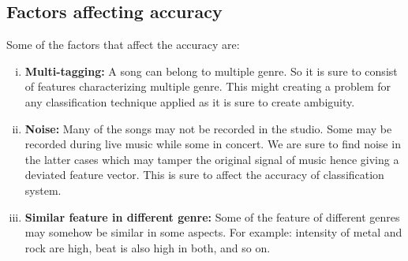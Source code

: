\subsection{Factors affecting accuracy}
Some of the factors that affect the accuracy are: 
\begin{enumerate}[(i)] 
        \item \textbf{Multi-tagging:} A song can belong to multiple genre. So it is sure to consist of features characterizing multiple genre. This might creating a
                problem for any classification technique applied as it is sure to create ambiguity. 
        \item \textbf{Noise:} Many of the songs may not be recorded in the studio. Some may be recorded during live music while some in concert. We are sure to find
                noise in the latter cases which may tamper the original signal of music hence giving a deviated feature vector. This is sure to affect the accuracy of classification system.
        \item \textbf{Similar feature in different genre:} Some of the feature of different genres may somehow be similar in some aspects. For example: intensity of metal
                and rock are high, beat is also high in both, and so on. 
\end{enumerate}
